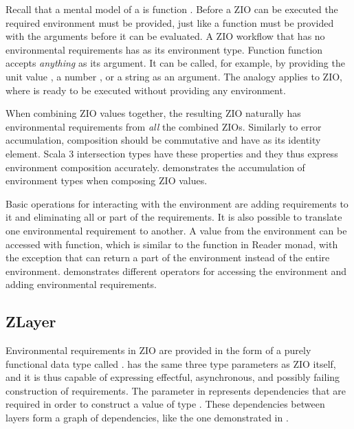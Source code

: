 Recall that a mental model of a  is function . Before a ZIO can be executed the required environment must be provided, just like a function must be provided with the arguments before it can be evaluated. A ZIO workflow that has no environmental requirements has  as its environment type. Function  function accepts \textit{anything} as its argument. It can be called, for example, by providing the unit value , a number , or a string  as an argument. The analogy applies to ZIO, where  is ready to be executed without providing any environment.



When combining ZIO values together, the resulting ZIO naturally has environmental requirements from \emph{all} the combined ZIOs. Similarly to error accumulation, composition should be commutative and have  as its identity element. Scala 3 intersection types have these properties and they thus express environment composition accurately.  demonstrates the accumulation of environment types when composing ZIO values.

Basic operations for interacting with the environment are adding requirements to it and eliminating all or part of the requirements. It is also possible to translate one environmental requirement to another. A value from the environment can be accessed with  function, which is similar to the  function in Reader monad, with the exception that  can return a part of the environment instead of the entire environment.  demonstrates different operators for accessing the environment and adding environmental requirements.




\subsection{ZLayer}
Environmental requirements in ZIO are provided in the form of a purely functional data type called .  has the same three type parameters as ZIO itself, and it is thus capable of expressing effectful, asynchronous, and possibly failing construction of requirements. The  parameter in  represents dependencies that are required in order to construct a value of type . These dependencies between layers form a graph of dependencies, like the one demonstrated in .


